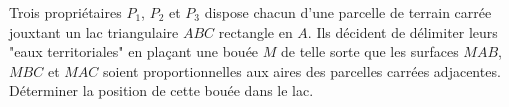 

Trois propriétaires $P_1$, $P_2$ et $P_3$ dispose chacun d'une parcelle de terrain carrée jouxtant un lac triangulaire $ABC$ rectangle en $A$. Ils décident de délimiter leurs "eaux territoriales" en plaçant une bouée $M$ de telle sorte que les surfaces $MAB$, $MBC$ et   $MAC$ soient proportionnelles aux aires des parcelles carrées adjacentes. Déterminer la position de cette bouée dans le lac.